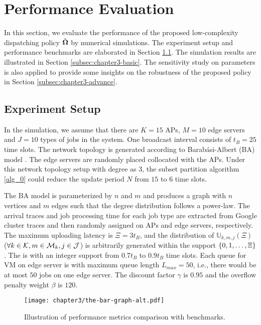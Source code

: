 \section{Performance Evaluation}
\label{sec:chapter3-evaluation}
In this section, we evaluate the performance of the proposed low-complexity dispatching policy $\tilde{\boldsymbol{\Omega}}$ by numerical simulations.
The experiment setup and performance benchmarks are elaborated in Section \ref{subsec:chapter3-setup}.
The simulation results are illustrated in Section \ref{subsec:chapter3-basic}.
The sensitivity study on parameters is also applied to provide some insights on the robustness of the proposed policy in Section \ref{subsec:chapter3-advance}.

\subsection{Experiment Setup}
\label{subsec:chapter3-setup}
In the simulation, we assume that there are $K=15$ APs, $M=10$ edge servers and $J=10$ types of jobs in the system.
One broadcast interval consists of $t_{B}=25$ time slots.
The network topology is generated according to Barab\'asi-Albert (BA) model \cite{albert1999diameter}.
The edge servers are randomly placed collocated with the APs.
Under this network topology setup with degree as $3$, the subset partition algorithm \ref{alg_0} could reduce the update period $N$ from $15$ to $6$ time slots.

The BA model is parameterized by $n$ and $m$ and produces a graph with $n$ vertices and $m$ edges such that the degree distribution follows a power-law.
The arrival traces and job processing time for each job type are extracted from Google cluster traces \cite{clusterdata:Reiss2011} and then randomly assigned on APs and edge servers, respectively.
The maximum uploading latency is $\Xi = 3t_B$, and the distribution of $\mathbb{U}_{k,m,j}(\Xi)$ ($\forall k\in\mathcal{K}, m\in\mathcal{M}_{k}, j\in\mathcal{J}$) is arbitrarily generated within the support $\{0, 1, \dots, \Xi\}$.
The {\brlatency} is with an integer support from $0.7t_B$ to $0.9t_B$ time slots.
Each queue for VM on edge server is with maximum queue length $L_{max}=50$, i.e., there would be at most $50$ jobs on one edge server.
The discount factor $\gamma$ is $0.95$ and the overflow penalty weight $\beta$ is $120$.

\begin{figure*}[ht]                                                      %
    \centering                                                          %
    \texttt{[image: chapter3/the-bar-graph-alt.pdf]}               %
    \caption{Illustration of performance metrics comparison with benchmarks.}
    \label{fig:bar_plot}                                                %
\end{figure*}                                                            %

